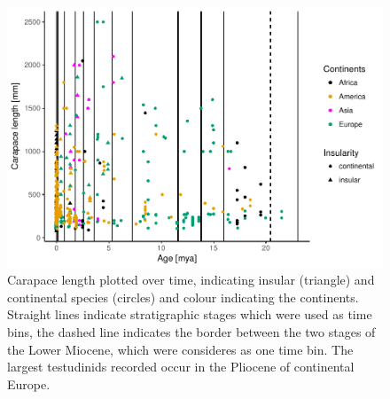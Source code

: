 


\begin{figure}[htbp]
	\centering
	\includegraphics[width=\textwidth]{MA_JJ_files/figure-latex/overviewData-1.pdf}
	\caption[Carapace length over time]{Carapace length plotted over time, indicating insular (triangle) and continental species (circles) and colour indicating the continents.
		Straight lines indicate stratigraphic stages which were used as time bins, the
		dashed line indicates the border between the two stages of the Lower Miocene,
		which were consideres as one time bin. The largest testudinids recorded occur in the Pliocene of continental Europe.}
	\label{fig:bins}
\end{figure}


